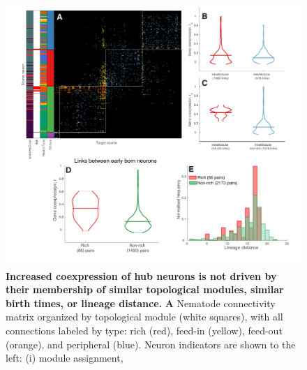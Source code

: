 \documentclass[10pt,letterpaper]{article}
\begin{document}

\begin{figure}[!h]
\centering
    \includegraphics[width=1\textwidth]{extrasALL.pdf}
 \caption{
 \textbf{Increased coexpression of hub neurons is not driven by their membership of similar topological modules, similar birth times, or lineage distance.}
\textbf{A} Nematode connectivity matrix organized by topological module (white squares), with all connections labeled by type: rich (red), feed-in (yellow), feed-out (orange), and peripheral (blue).
Neuron indicators are shown to the left:
(i) module assignment,
}
\end{figure}
\end{document}
